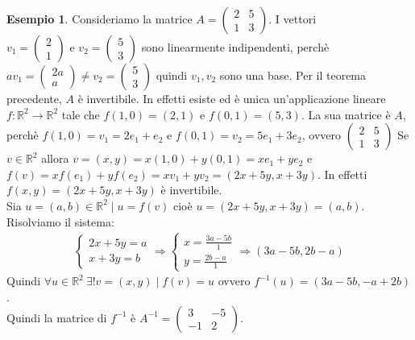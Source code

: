 \documentclass[a4paper]{article}
\theoremstyle{definition}
\newtheorem*{es}{Esempio}
\begin{document}
\begin{es}
	Consideriamo la matrice $A = \begin{pmatrix}
			2 & 5 \\
			1 & 3
		\end{pmatrix}$. I vettori $v_1 = \begin{pmatrix}
			2 \\
			1
		\end{pmatrix} \text{ e } v_2 = \begin{pmatrix}
			5 \\
			3
		\end{pmatrix}$ sono linearmente indipendenti, perchè $av_1 = \begin{pmatrix}
			2a \\
			a
		\end{pmatrix} \neq v_2 = \begin{pmatrix}
			5 \\
			3
		\end{pmatrix}$ quindi $v_1, v_2$ sono una base.
	Per il teorema precedente, $A$ è invertibile.
	In effetti esiste ed è unica un'applicazione lineare $f: \mathbb{R}^2 \rightarrow \mathbb{R}^2$ tale che $f(1, 0) = (2, 1)$ e $f(0, 1) = (5, 3)$.
	La sua matrice è $A$, perchè $f(1, 0) = v_1 = 2 e_1 + e_2$ e $f(0, 1) = v_2 = 5e_1 + 3e_2$, ovvero $\begin{pmatrix}
			2 & 5 \\
			1 & 3
		\end{pmatrix}$
	Se $v \in \mathbb{R}^2$ allora $v = (x, y) = x(1, 0) + y(0, 1) = xe_1 + ye_2$ e $f(v) = xf(e_1) + yf(e_2) = xv_1 + yv_2 = (2x + 5y, x + 3y)$.
	In effetti $f(x, y) = (2x + 5y, x + 3y)$ è invertibile. \\
	Sia $u = (a, b) \in \mathbb{R}^2 \mid u = f(v)$ cioè $u = (2x + 5y, x + 3y) = (a, b)$. Risolviamo il sistema:
	\begin{align*}
		\begin{cases}
			2x + 5y = a \\
			x + 3y = b
		\end{cases} \Rightarrow \begin{cases}
			                        x = \frac{3a - 5b}{1} \\
			                        y = \frac{2b - a}{1}
		                        \end{cases} \Rightarrow (3a - 5b, 2b - a)
	\end{align*}
	Quindi $\forall u \in \mathbb{R}^2 \ \exists! v = (x, y) \mid f(v) = u$ ovvero $f^{-1}(u) = (3a - 5b, -a + 2b)$. \\
	Quindi la matrice di $f^{-1}$ è $A^{-1} = \begin{pmatrix}
			3  & -5 \\
			-1 & 2
		\end{pmatrix}$.
\end{es}
\end{document}

